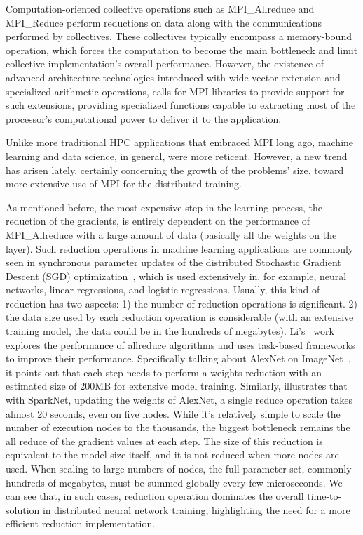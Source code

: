 \documentclass[5p,times,twocolumn]{elsarticle}
\newcommand{\mpi}[0]{\textsc{MPI}\xspace}
\newcommand{\sve}[0]{\textsc{SVE}\xspace}
\begin{document}
Computation-oriented collective operations such as MPI\_Allreduce and MPI\_Reduce perform reductions on
data along with the communications performed by collectives.
These collectives typically encompass a memory-bound operation, which forces
the computation to become the main bottleneck and limit collective implementation's overall performance.
However, the existence of advanced architecture technologies introduced
with wide vector extension and specialized arithmetic operations, calls for
MPI libraries to provide support for such extensions, providing specialized functions
capable to extracting most of the processor's computational power to deliver it to the application.


Unlike more traditional HPC applications that embraced MPI long ago,
machine learning and data science, in general, were more reticent. However,
a new trend has arisen lately, certainly concerning the growth
of the problems' size, toward more extensive use of \mpi for the distributed training.

As mentioned before, the most expensive step in the learning process, the reduction of the gradients, is entirely dependent on the performance of MPI\_Allreduce with a large amount of data (basically all the weights on the layer).
Such reduction operations in machine learning applications
are commonly seen in synchronous parameter updates of the distributed Stochastic
Gradient Descent (SGD) optimization~\cite{sgd10}, which is used extensively
in, for example, neural networks, linear regressions, and logistic
regressions. Usually, this kind of reduction has two aspects: 1) the number of reduction
operations is significant. 2) the data size used by each reduction operation is considerable (with an extensive training model, the data could be in the hundreds of megabytes).
%
Li's~\cite{inproceedings} work explores the performance of allreduce algorithms
and uses task-based frameworks to improve their performance. Specifically talking about AlexNet on ImageNet~\cite{NIPS20124824}, it points out that
each step needs to perform a weights reduction with an estimated size
of 200MB for extensive model training.
%
Similarly, \cite{moritz2015sparknet}
illustrates that with SparkNet, updating the weights of AlexNet, a single reduce
operation takes almost 20 seconds, even on five nodes. While it's relatively simple to scale
the number of execution nodes to the thousands, the biggest bottleneck remains the all reduce of
the gradient values at each step. The size of this reduction is equivalent
to the model size itself, and it is not reduced when more
nodes are used. When scaling to large numbers of nodes, the full parameter set, commonly hundreds of
megabytes, must be summed globally every few microseconds. We can see that, in such cases,
reduction operation dominates the overall time-to-solution in distributed neural network
training, highlighting the need for a more efficient reduction implementation.
\end{document}
